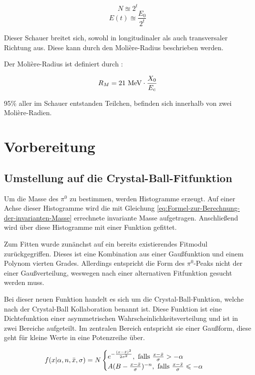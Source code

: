 \documentclass[a4paper,11pt,oneside,final,german,openbib,pdftex]{scrbook}
\begin{document}
{\begin{equation}
N\approxeq 2^t
\end{equation}
\begin{equation}
E(t) \approxeq \frac{E_0}{2^t}
\end{equation}

Dieser Schauer breitet sich, sowohl in longitudinaler als auch transversaler Richtung aus. Diese kann durch den Molière-Radius beschrieben werden. 

Der Molière-Radius ist definiert durch \cite{Leo87}:

\begin{equation}
R_M = 21 \textnormal{ MeV}\cdot \frac{X_0}{E_c}
\end{equation}

95\% aller im Schauer entstanden Teilchen, befinden sich innerhalb von zwei Molière-Radien. 

\chapter{Vorbereitung}

\section{Umstellung auf die Crystal-Ball-Fitfunktion}
\label{sec:CB-Funktion}

Um die Masse des $\pi^0$ zu bestimmen, werden Histogramme erzeugt. Auf einer Achse dieser Histogramme wird die mit Gleichung \ref{eq:Formel-zur-Berechnung-der-invarianten-Masse} errechnete invariante Masse aufgetragen. Anschlie{\ss}end wird \"uber diese Histogramme mit einer Funktion gefittet.

Zum Fitten wurde zun\"anchst auf ein bereits existierendes Fitmodul zur\"uckgegriffen. Dieses ist eine Kombination aus einer Gau{\ss}funktion und einem Polynom vierten Grades. Allerdings entspricht die Form des $\pi^0$-Peaks nicht der einer Gau{\ss}verteilung, weswegen nach einer alternativen Fitfunktion gesucht werden muss. 

Bei dieser neuen Funktion handelt es sich um die Crystal-Ball-Funktion, welche nach der Crystal-Ball Kollaboration benannt ist. Diese Funktion ist eine Dichtefunktion einer asymmetrischen Wahrscheinlichkeitsverteilung und ist in zwei Bereiche aufgeteilt. Im zentralen Bereich entspricht sie einer Gau{\ss}form, diese geht f\"ur kleine Werte in eine Potenzreihe \"uber.

\begin{equation}
f(x|\alpha,n,\bar{x},\sigma)=N\begin{cases}e^{-\frac{(x-\bar{x})^2}{2\sigma^2}}, \textnormal{  falls $\frac{x-\bar{x}}{\sigma}> -\alpha$} \\
A(B-\frac{x-\bar{x}}{\sigma})^{-n}, \textnormal{  falls $\frac{x-\bar{x}}{\sigma}\leqslant -\alpha$} 
\end{cases}
\label{eq:Crystal-Ball-Funktion}
\end{equation}

}
\end{document}
